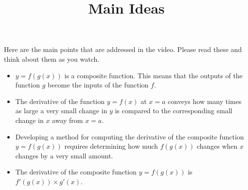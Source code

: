 \documentclass[handout]{ximera}
\title{Main Ideas}
\begin{document}
\begin{abstract}
\end{abstract}

\maketitle

Here are the main points that are addressed in the video. Please read these and think about them as you watch.


\begin{itemize}
\item $y = f(g(x))$ is a composite function. This means that the outputs of the function $g$ become the inputs of the function $f$.
\item The derivative of the function $y = f(x)$ at $x = a$ conveys how many times as large a very small change in $y$ is compared to the corresponding small change in $x$ away from $x = a$.
\item Developing a method for computing the derivative of the composite function $y = f(g(x))$ requires determining how much $f(g(x))$ changes when $x$ changes by a very small amount.
\item The derivative of the composite function $y = f(g(x))$ is $f'(g(x)) \times g'(x)$.
\end{itemize}
\end{document}
